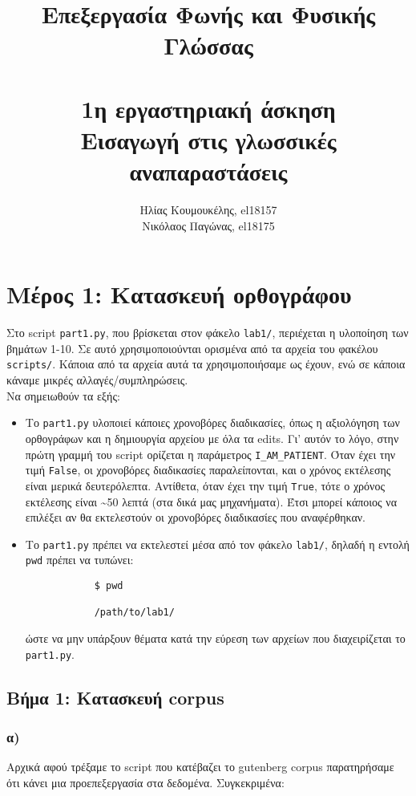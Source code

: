 \documentclass[a4paper, 12pt]{article}
\title{
	\textbf{Επεξεργασία Φωνής και Φυσικής Γλώσσας} \\~\\
	1η εργαστηριακή άσκηση\\ 
	Εισαγωγή στις γλωσσικές αναπαραστάσεις
}
\author{
	Ηλίας Κουμουκέλης, el18157 \\
	Νικόλαος Παγώνας, el18175
}
\date{}
\begin{document}
\maketitle

\section*{Μέρος 1: Κατασκευή ορθογράφου}
	Στο script \verb|part1.py|, που βρίσκεται στον φάκελο \verb|lab1/|, περιέχεται η υλοποίηση των βημάτων 1-10. Σε αυτό χρησιμοποιούνται ορισμένα από τα αρχεία του φακέλου \verb|scripts/|. Κάποια από τα αρχεία αυτά τα χρησιμοποιήσαμε ως έχουν, ενώ σε κάποια κάναμε μικρές αλλαγές/συμπληρώσεις. \\
	
	Να σημειωθούν τα εξής:
	
	\begin{itemize}
		\item Το \verb|part1.py| υλοποιεί κάποιες χρονοβόρες διαδικασίες, όπως η αξιολόγηση των ορθογράφων και η δημιουργία αρχείου με όλα τα edits. Γι' αυτόν το λόγο, στην πρώτη γραμμή του script ορίζεται η παράμετρος \verb|I_AM_PATIENT|. Όταν έχει την τιμή \verb|False|, οι χρονοβόρες διαδικασίες παραλείπονται, και ο χρόνος εκτέλεσης είναι μερικά δευτερόλεπτα. Αντίθετα, όταν έχει την τιμή \verb|True|, τότε ο χρόνος εκτέλεσης είναι \textasciitilde50 λεπτά (στα δικά μας μηχανήματα). Έτσι μπορεί κάποιος να επιλέξει αν θα εκτελεστούν οι χρονοβόρες διαδικασίες που αναφέρθηκαν. 
		\item Το \verb|part1.py| πρέπει να εκτελεστεί μέσα από τον φάκελο \verb|lab1/|, δηλαδή η εντολή \verb|pwd| πρέπει να τυπώνει: 
		
		\begin{verbatim}
			$ pwd
			
			/path/to/lab1/
		\end{verbatim}
		
		ώστε να μην υπάρξουν θέματα κατά την εύρεση των αρχείων που διαχειρίζεται το \verb|part1.py|.
	\end{itemize} 
	
    \subsection*{Βήμα 1: Κατασκευή corpus}
        \subsubsection*{α)}
        	Αρχικά αφού τρέξαμε το script που κατέβαζει το gutenberg corpus παρατηρήσαμε ότι κάνει μια προεπεξεργασία στα δεδομένα. Συγκεκριμένα:
        	
\end{document}
